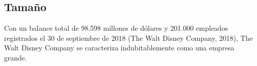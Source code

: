 \subsection{Tamaño}

Con un balance total de 98.598 millones de dólares y 201.000 empleados registrados el 30 de septiembre de 2018 (The Walt Disney Company, 2018), The Walt Disney Company se caracteriza indubitablemente como una empresa grande.